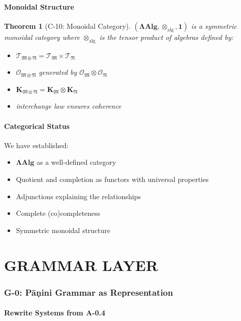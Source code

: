 \documentclass[12pt, oneside]{article}
\newtheorem{theorem}{Theorem}[section]
\newcommand{\K}{\mathbf{K}}
\newcommand{\T}{\mathcal{T}}
\newcommand{\Opr}{\mathcal{O}}
\newcommand{\mf}[1]{\mathfrak{#1}}
\begin{document}
\subsection{Monoidal Structure}

\begin{theorem}[C-10: Monoidal Category]
$(\mathbf{ΛAlg}, \otimes_{\text{alg}}, \mathbf{1})$ is a symmetric monoidal category where $\otimes_{\text{alg}}$ is the tensor product of algebras defined by:
\begin{itemize}
    \item $\T_{\mf{M} \otimes \mf{N}} = \T_{\mf{M}} \times \T_{\mf{N}}$
    \item $\Opr_{\mf{M} \otimes \mf{N}}$ generated by $\Opr_{\mf{M}} \otimes \Opr_{\mf{N}}$
    \item $\K_{\mf{M} \otimes \mf{N}} = \K_{\mf{M}} \otimes \K_{\mf{N}}$
    \item interchange law ensures coherence
\end{itemize}
\end{theorem}

\subsection{Categorical Status}

We have established:
\begin{itemize}
    \item $\mathbf{ΛAlg}$ as a well-defined category
    \item Quotient and completion as functors with universal properties
    \item Adjunctions explaining the relationships
    \item Complete (co)completeness
    \item Symmetric monoidal structure
\end{itemize}

\newpage

\part{GRAMMAR LAYER}

\section{G-0: Pāṇini Grammar as Representation}

\subsection{Rewrite Systems from A-0.4}
\end{document}
